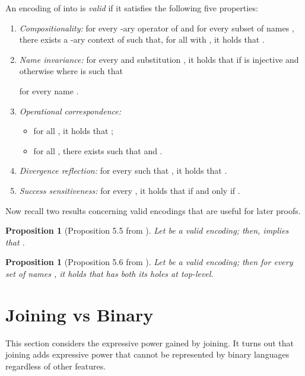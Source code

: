 \documentclass[submission,copyright,creativecommons]{eptcs}
\newtheorem{proposition}[theorem]{Proposition}
\newenvironment{definition}[1][Definition]{\begin{trivlist}
\item[\hskip \labelsep {\bfseries #1}]}{\end{trivlist}}
\begin{document}
\begin{definition}[Valid Encoding]
\label{def:ve}
An encoding  of  into 
is {\em valid} if it satisfies the following five properties:
\begin{enumerate}
\item {\em Compositionality:} for every -ary operator  of 
and for every subset of names ,
there exists a -ary context  of 
such that, for all  with , it holds
that .

\item {\em Name invariance:}
for every  and substitution , it holds that
 if  is injective and
 otherwise
where  is such that 

for every name .

\item {\em Operational correspondence:}
\begin{itemize}
\item for all , it holds that ;
\item for all , there exists  such that  
and .
\end{itemize}

\item {\em Divergence reflection:}
for every  such that 
, it holds that   \mbox{}.

\item {\em Success sensitiveness:}
for every , it holds that  if and only if .
\end{enumerate}
\end{definition}

Now recall two results concerning valid encodings that are useful for later proofs.

\begin{proposition}[Proposition 5.5 from \cite{G:CONCUR08}]
\label{prop:deadlock}
Let  be a valid encoding; then, 
implies that .
\end{proposition}

\begin{proposition}[Proposition 5.6 from \cite{G:CONCUR08}]
\label{prop:ctx_top}
Let  be a valid encoding; then for every set of names ,
it holds that  has both its holes at top-level.
\end{proposition}

\section{Joining vs Binary}
\label{sec:join_only}

This section considers the expressive power gained by joining. It turns out that joining adds expressive
power that cannot be represented by binary languages regardless of other features.
\end{document}
